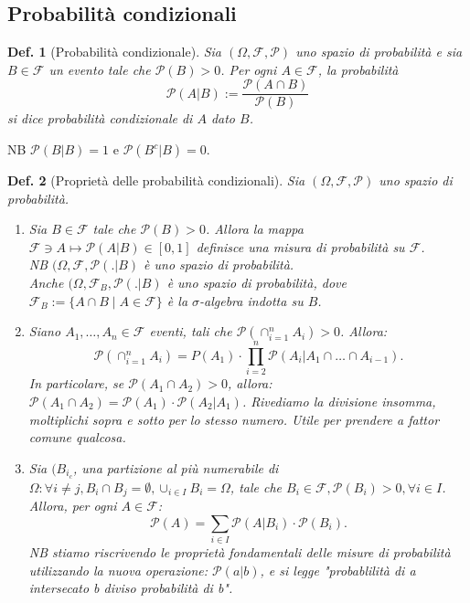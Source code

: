 \documentclass{article}
\newtheorem{definition}{Def.}[section]
\begin{document}
\subsection{Probabilità condizionali}
\begin{definition}[Probabilità condizionale] Sia $(\Omega, \mathcal{F},
\mathcal{P})$ uno spazio di probabilità e sia $B \in \mathcal{F}$ un evento tale
che $\mathcal{P}(B) > 0$. Per ogni $A \in \mathcal{F}$, la probabilità
\begin{equation}
	\mathcal{P}(A | B) := \frac{\mathcal{P}(A \cap B)}{\mathcal{P}(B)}
\end{equation}
si dice probabilità condizionale di $A$ dato $B$.
\end{definition}
NB $\mathcal{P}(B | B) = 1$ e $\mathcal{P}(B^c | B) = 0$.

\begin{definition}[Proprietà delle probabilità condizionali]
Sia $(\Omega, \mathcal{F}, \mathcal{P})$ uno spazio di probabilità.
\begin{enumerate}
	\item Sia $B \in \mathcal{F}$ tale che $\mathcal{P}(B) > 0$. Allora la mappa
		$\mathcal{F} \ni A \mapsto \mathcal{P}(A | B) \in [0, 1]$ definisce una
		misura di probabilità su $\mathcal{F}$.\\
		NB $(\Omega, \mathcal{F}, \mathcal{P}(.|B)$ è uno spazio di
		probabilità.\\
		Anche $(\Omega, \mathcal{F}_B, \mathcal{P}(.|B)$ è uno spazio di
		probabilità, dove $\mathcal{F}_B := \{A \cap B \mid A \in
		\mathcal{F}\}$ è la $\sigma$-algebra indotta su $B$.

	\item Siano $A_1, \dots, A_n \in \mathcal{F}$ eventi, tali che
		$\mathcal{P}(\cap_{i=1}^n A_i) > 0$. Allora:
		\begin{equation}
			\mathcal{P}(\cap_{i=1}^n A_i) = P(A_1) \cdot \prod_{i=2}^n
			\mathcal{P}(A_i | A_1 \cap \dots \cap A_{i-1}).
		\end{equation}
		In particolare, se $\mathcal{P}(A_1 \cap A_2) > 0$, allora: $\mathcal{P}(A_1
		\cap A_2) = \mathcal{P}(A_1) \cdot \mathcal{P}(A_2 | A_1)$.
		Rivediamo la divisione insomma, moltiplichi sopra e sotto per lo stesso
		numero.
		Utile per prendere a fattor comune qualcosa.

	\item Sia $(B_{i_c}$, una partizione al più numerabile di $\Omega: \forall i
		\neq j, B_i \cap B_j = \emptyset, \cup_{i \in I} B_i = \Omega$, tale che
		$B_i \in \mathcal{F}, \mathcal{P}(B_i) > 0, \forall i \in I$. Allora,
		per ogni $A \in \mathcal{F}$:
		\begin{equation}
			\mathcal{P}(A) = \sum_{i \in I} \mathcal{P}(A | B_i) \cdot
			\mathcal{P}(B_i).
		\end{equation}
		NB stiamo riscrivendo le proprietà fondamentali delle misure di probabilità
		utilizzando la nuova operazione: $\mathcal{P}(a|b)$, e si legge
		"probablilità di a intersecato b diviso probabilità di b".
\end{enumerate}
\end{definition}
\end{document}
